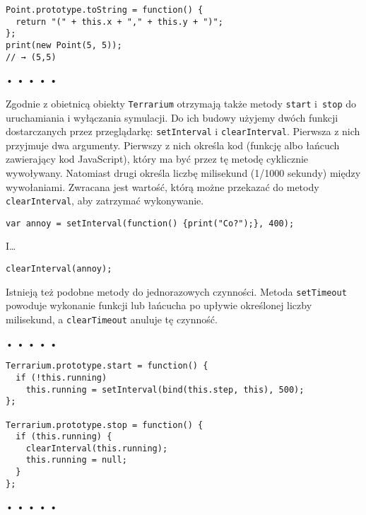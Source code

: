   
\begin{verbatim} 
Point.prototype.toString = function() {
  return "(" + this.x + "," + this.y + ")";
};
print(new Point(5, 5));
// → (5,5)
\end{verbatim}


\begin{center}
• • • • •
\end{center}

  
Zgodnie z obietnicą obiekty \texttt{Terrarium} otrzymają także metody \texttt{start} i~\texttt{stop} do uruchamiania i wyłączania symulacji. Do ich budowy użyjemy dwóch funkcji dostarczanych przez przeglądarkę: \texttt{setInterval} i \texttt{clearInterval}. Pierwsza z nich przyjmuje dwa argumenty. Pierwszy z nich określa kod (funkcję albo łańcuch zawierający kod JavaScript), który ma być przez tę metodę cyklicznie wywoływany. Natomiast drugi określa liczbę milisekund (1/1000 sekundy) między wywołaniami. Zwracana jest wartość, którą możne przekazać do metody \texttt{clearInterval}, aby zatrzymać wykonywanie.

  
\begin{verbatim} 
var annoy = setInterval(function() {print("Co?");}, 400);
\end{verbatim}
  
I…

  
\begin{verbatim} 
clearInterval(annoy);
\end{verbatim}
  
Istnieją też podobne metody do jednorazowych czynności. Metoda \texttt{setTimeout} powoduje wykonanie funkcji lub łańcucha po upływie określonej liczby milisekund, a \texttt{clearTimeout} anuluje tę czynność.



\begin{center}
• • • • •
\end{center}

  
\begin{verbatim} 
Terrarium.prototype.start = function() {
  if (!this.running)
    this.running = setInterval(bind(this.step, this), 500);
};

Terrarium.prototype.stop = function() {
  if (this.running) {
    clearInterval(this.running);
    this.running = null;
  }
};
 \end{verbatim}


\begin{center}
• • • • •
\end{center}

